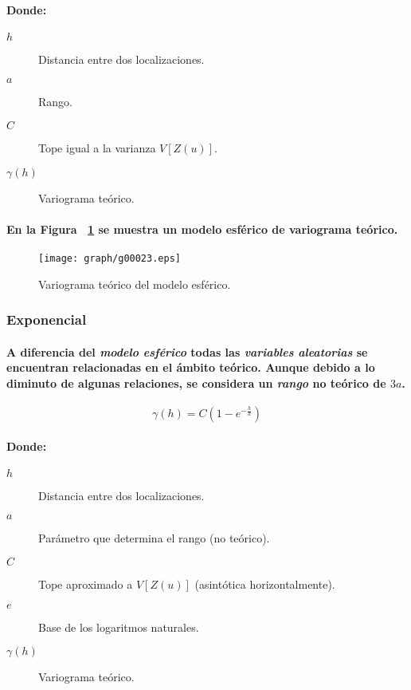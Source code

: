 \paragraph{
Donde:
}
\begin{description}
\item[$h$] Distancia entre dos localizaciones.
\item[$a$] Rango.
\item[$C$] Tope igual a la varianza $V[Z(u)]$.
\item[$\gamma(h)$] Variograma teórico.
\end{description}
\paragraph{
En la Figura ~\ref{fig:VariogramaTeoricoModeloEsferico} se muestra un modelo esférico de variograma teórico.
}
\begin{figure}[ht]
\centering
\texttt{[image: graph/g00023.eps]}
\caption[Variograma teórico del modelo esférico.]{Variograma teórico del modelo esférico.}
\label{fig:VariogramaTeoricoModeloEsferico}
\end{figure}

\subsubsection{Exponencial}
\paragraph{
A diferencia del \emph{modelo esférico} todas las \emph{variables aleatorias} se encuentran relacionadas en el ámbito teórico. Aunque debido a lo diminuto de algunas relaciones, se considera un \emph{rango} no teórico de $3a$.
}
\begin{equation}
\gamma(h) = C(1-e^{-\frac{h}{a}})
\end{equation}
\paragraph{
Donde:
}
\begin{description}
\item[$h$] Distancia entre dos localizaciones.
\item[$a$] Parámetro que determina el rango (no teórico).
\item[$C$] Tope aproximado a $V[Z(u)]$ (asintótica horizontalmente).
\item[$e$] Base de los logaritmos naturales.
\item[$\gamma(h)$] Variograma teórico.
\end{description}
